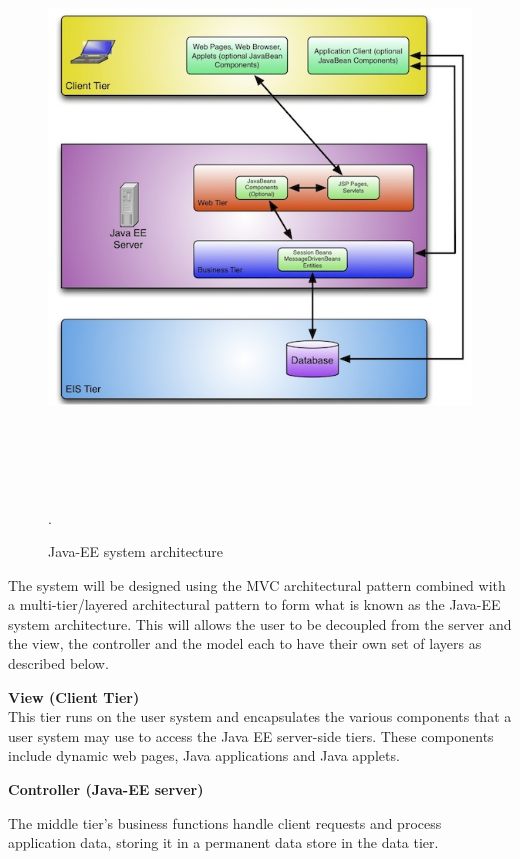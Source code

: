 \begin{flushleft}
	\begin{figure}[H]
		\centering\graphicspath{ {images/} }
		\includegraphics[width=\textwidth, height=15cm]{MVC.jpg}
	   	\caption{Java-EE system architecture}.
	\end{figure}

The system will be designed using the MVC architectural pattern combined
with a multi-tier/layered architectural pattern to form what is known as the Java-EE system architecture.
This will allows the user to be decoupled from the server and the view, the controller and the model each 
to have their own set of layers as described below.

\textbf{View (Client Tier)}\\
This tier runs on the user system and encapsulates the various components that a user system may use to access the Java EE server-side tiers. These components include dynamic web pages, Java applications and Java applets. 

\textbf{Controller (Java-EE server)}

The middle tier's business functions handle client requests and process application data, storing it in a permanent data store in the data tier.


\end{flushleft}
